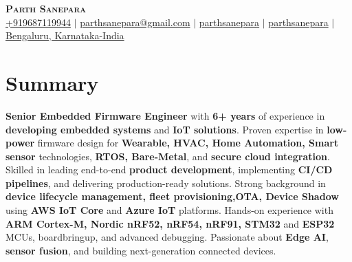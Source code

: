 \documentclass[letterpaper,11pt]{article}
\begin{document}

\begin{center}
    \textbf{\Huge \scshape Parth Sanepara} \\ \vspace{3pt}
    \small
    \faMobile \hspace{.5pt} \href{tel:9687119944}{+919687119944}
    $|$
    \faEnvelope \hspace{.5pt} \href{mailto:parthsanepara@gmail.com}{parthsanepara@gmail.com}
    $|$
    \faLinkedinSquare \hspace{.5pt} \href{https://www.linkedin.com/in/parthsanepara}{parthsanepara}
    $|$
    \faGithub \hspace{.5pt} \href{https://github.com/parthsanepara}{parthsanepara}
    $|$
    \faMapMarker \hspace{.5pt} \href{https://maps.app.goo.gl/cc5ibm6jAiXmRFp17}{Bengaluru, Karnataka-India}
\end{center}
\vspace{-19pt} %
\section{Summary}
  \vspace{-2pt}
\textbf{Senior Embedded Firmware Engineer} with \textbf{6+ years} of experience in \textbf{developing embedded systems} and \textbf{IoT solutions}. Proven expertise in \textbf{low-power} firmware design for \textbf{Wearable, HVAC, Home Automation, Smart sensor} technologies, \textbf{RTOS, Bare-Metal}, and \textbf{secure cloud integration}. Skilled in leading end-to-end \textbf{product development}, implementing \textbf{CI/CD pipelines}, and delivering production-ready solutions. Strong background in \textbf{device lifecycle management, fleet provisioning,OTA, Device Shadow} using \textbf{AWS IoT Core} and \textbf{Azure IoT} platforms. Hands-on experience with \textbf{ARM Cortex-M, Nordic nRF52, nRF54, nRF91, STM32} and \textbf{ESP32} MCUs, boardbringup, and advanced debugging. Passionate about \textbf{Edge AI}, \textbf{sensor fusion}, and building next-generation connected devices.


\vspace{-10pt} %

\end{document}
